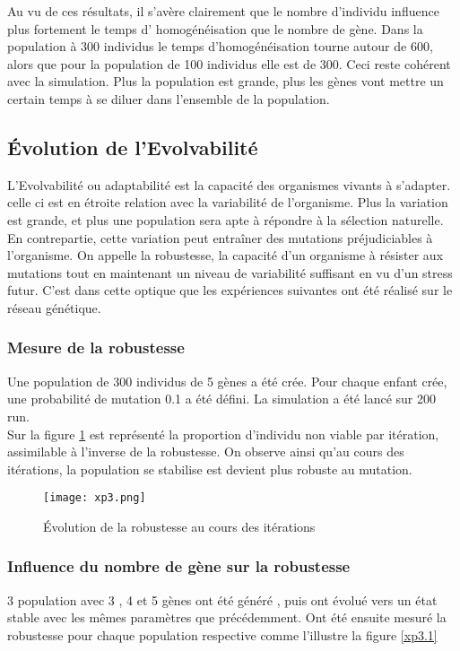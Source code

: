 \documentclass{article}
\begin{document}
	Au vu de ces résultats, il s'avère clairement que le nombre d’individu influence plus fortement le temps d' homogénéisation que le nombre de gène. Dans la population à 300 individus le temps d’homogénéisation tourne autour de 600, alors que pour la population de 100 individus elle est de 300. Ceci reste cohérent avec la simulation. Plus la population est grande, plus les gènes vont mettre un certain temps à se diluer dans l'ensemble de la population. 


	\subsection{Évolution de l'Evolvabilité}
	L'Evolvabilité ou adaptabilité est la capacité des organismes vivants à s'adapter. celle ci est en étroite relation avec la variabilité de l'organisme. Plus la variation est grande, et plus une population sera apte à répondre à la sélection naturelle. En contrepartie, cette variation peut entraîner des mutations préjudiciables à l'organisme. On appelle la robustesse, la capacité d'un organisme à résister aux mutations tout en maintenant un niveau de variabilité suffisant en vu d'un stress futur. C'est dans cette optique que les expériences suivantes ont été réalisé sur le réseau génétique.

	
	\subsubsection{Mesure de la robustesse}
	Une population de 300 individus de 5 gènes a été crée. Pour chaque enfant crée, une probabilité de mutation 0.1 a été défini. La simulation a été lancé sur 200 run. \\
	Sur la figure \ref{xp3} est représenté la proportion d'individu non viable par itération, assimilable à l'inverse de la robustesse. On observe ainsi qu'au cours des itérations, la population se stabilise est devient plus robuste au mutation.

	
	\begin{figure}[h]
	\centering
	\caption[test]{Évolution de la robustesse au cours des itérations }
	\texttt{[image: xp3.png]}
	\label{xp3}
	\end{figure}

	 \newpage

	\subsubsection{Influence du nombre de gène sur la robustesse}
	3 population avec  3 , 4 et 5 gènes ont été généré , puis ont évolué vers un état stable avec les mêmes paramètres que précédemment. 
	Ont été ensuite mesuré la robustesse pour chaque population respective comme l'illustre la figure \ref{xp3.1}
\end{document}
